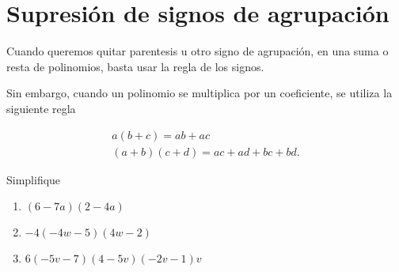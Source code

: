 
\section{Supresi\'on de signos de agrupaci\'on}


	Cuando queremos quitar parentesis u otro signo de agrupaci\'on, en una suma o resta de polinomios, basta usar la regla de los signos.



	Sin embargo, cuando un polinomio se multiplica por un coeficiente, se utiliza la siguiente regla
	\begin{proposicion}
		\begin{eqnarray}
			\label{distribucion}
			a\left( b+c \right)=ab+ac\\
			\left( a+b \right)\left( c+d \right)=ac+ad+bc+bd.
		\end{eqnarray}
		
	\end{proposicion}
	



	\begin{problema} Simplifique
		\begin{enumerate}
			\item $(6-7a)(2-4a)$
			\item $-4(-4w-5)(4w-2)$
			\item $6(-5v-7)(4-5v)(-2v-1)v$
		\end{enumerate}	
	\end{problema}
	

